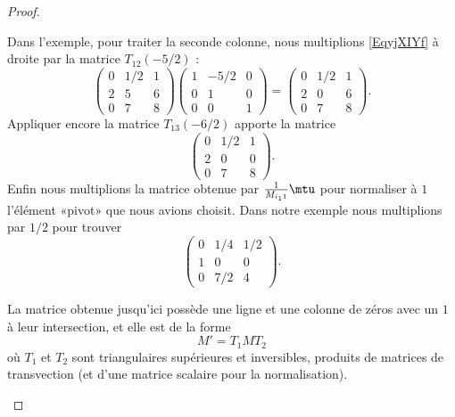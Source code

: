 \begin{proof}
\begin{subproof}
    Dans l'exemple, pour traiter la seconde colonne, nous multiplions \eqref{EqyjXIYf} à droite par la matrice \( T_{12}(-5/2)\) :
    \begin{equation}
            \begin{pmatrix}
                0    &   1/2    &   1    \\
                2    &   5    &   6    \\
                0    &   7    &   8
            \end{pmatrix}
            \begin{pmatrix}
                1    &   -5/2    &   0    \\
                0    &   1    &   0    \\
                0    &   0    &   1
            \end{pmatrix}=
            \begin{pmatrix}
                0    &   1/2    &   1    \\
                2    &   0    &   6    \\
                0    &   7    &   8
            \end{pmatrix}.
    \end{equation}
    Appliquer encore la matrice \( T_{13}(-6/2)\) apporte la matrice
    \begin{equation}
        \begin{pmatrix}
            0    &   1/2    &   1    \\
            2    &   0    &   0    \\
            0    &   7    &   8
        \end{pmatrix}.
    \end{equation}
    Enfin nous multiplions la matrice obtenue par \( \frac{1}{ M_{i_11} }\mtu\) pour normaliser à \( 1\) l'élément «pivot» que nous avions choisit. Dans notre exemple nous multiplions par \( 1/2\) pour trouver
    \begin{equation}        \label{Eqduglwu}
        \begin{pmatrix}
            0    &   1/4    &   1/2    \\
            1    &   0    &   0    \\
            0    &   7/2    &   4
        \end{pmatrix}.
    \end{equation}

    La matrice obtenue jusqu'ici possède une ligne et une colonne de zéros avec un \( 1\) à leur intersection, et elle est de la forme
    \begin{equation}
        M'=T_1MT_2
    \end{equation}
    où \( T_1\) et \( T_2\) sont triangulaires supérieures et inversibles, produits de matrices de transvection (et d'une matrice scalaire pour la normalisation).


\end{subproof}
\end{proof}

